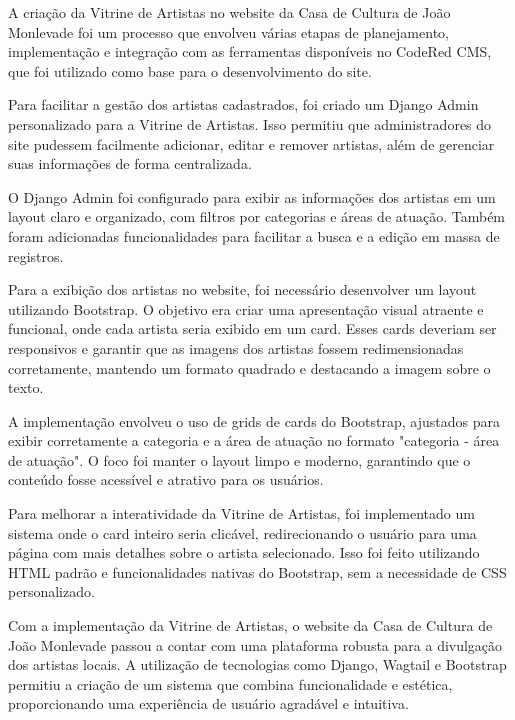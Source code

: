 A criação da Vitrine de Artistas no website da Casa de Cultura de João Monlevade foi um processo que envolveu várias etapas de planejamento, implementação e integração com as ferramentas disponíveis no CodeRed CMS, que foi utilizado como base para o desenvolvimento do site.




Para facilitar a gestão dos artistas cadastrados, foi criado um Django Admin personalizado para a Vitrine de Artistas. Isso permitiu que administradores do site pudessem facilmente adicionar, editar e remover artistas, além de gerenciar suas informações de forma centralizada.

O Django Admin foi configurado para exibir as informações dos artistas em um layout claro e organizado, com filtros por categorias e áreas de atuação. Também foram adicionadas funcionalidades para facilitar a busca e a edição em massa de registros.


Para a exibição dos artistas no website, foi necessário desenvolver um layout utilizando Bootstrap. O objetivo era criar uma apresentação visual atraente e funcional, onde cada artista seria exibido em um card. Esses cards deveriam ser responsivos e garantir que as imagens dos artistas fossem redimensionadas corretamente, mantendo um formato quadrado e destacando a imagem sobre o texto.

A implementação envolveu o uso de grids de cards do Bootstrap, ajustados para exibir corretamente a categoria e a área de atuação no formato "categoria - área de atuação". O foco foi manter o layout limpo e moderno, garantindo que o conteúdo fosse acessível e atrativo para os usuários.

Para melhorar a interatividade da Vitrine de Artistas, foi implementado um sistema onde o card inteiro seria clicável, redirecionando o usuário para uma página com mais detalhes sobre o artista selecionado. Isso foi feito utilizando HTML padrão e funcionalidades nativas do Bootstrap, sem a necessidade de CSS personalizado.

Com a implementação da Vitrine de Artistas, o website da Casa de Cultura de João Monlevade passou a contar com uma plataforma robusta para a divulgação dos artistas locais. A utilização de tecnologias como Django, Wagtail e Bootstrap permitiu a criação de um sistema que combina funcionalidade e estética, proporcionando uma experiência de usuário agradável e intuitiva.

